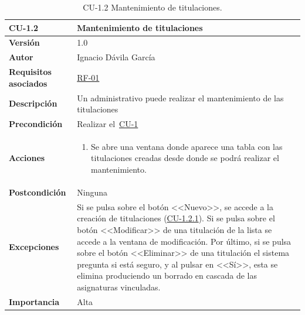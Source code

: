 \begin{table}[p]
\label{table:CU-1.2}
	\centering
	\begin{tabularx}{\linewidth}{ p{} p{} }
		\toprule
		\textbf{CU-1.2}    & \textbf{Mantenimiento de titulaciones}\\
		\toprule
		\textbf{Versión}              & 1.0    \\
		\textbf{Autor}                & Ignacio Dávila García \\
		\textbf{Requisitos asociados} & \hyperref[itm:RF1]{RF-01} \\
		\textbf{Descripción}          & Un administrativo puede realizar el mantenimiento de las titulaciones \\
		\textbf{Precondición}         & Realizar el~\hyperref[table:CU-1]{CU-1} \\
		\textbf{Acciones}             &
		\begin{enumerate}
			\def\labelenumi{\arabic{enumi}.}
			\tightlist
			\item Se abre una ventana donde aparece una tabla con las titulaciones creadas desde donde se podrá realizar el mantenimiento.
		\end{enumerate}\\
		\textbf{Postcondición}        & Ninguna \\
		\textbf{Excepciones}          & Si se pulsa sobre el botón <<Nuevo>>, se accede a la creación de titulaciones (\hyperref[table:CU-1.2.1]{CU-1.2.1}). Si se pulsa sobre el botón <<Modificar>> de una titulación de la lista se accede a la ventana de modificación. Por último, si se pulsa sobre el botón <<Eliminar>> de una titulación el sistema pregunta si está seguro, y al pulsar en <<Sí>>, esta se elimina produciendo un borrado en cascada de las asignaturas vinculadas. \\
		\textbf{Importancia}          & Alta \\
		\bottomrule
	\end{tabularx}
	\caption{CU-1.2 Mantenimiento de titulaciones.}
\end{table}
\FloatBarrier

